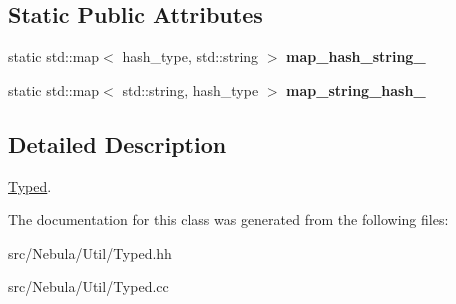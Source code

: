\subsection*{\-Static \-Public \-Attributes}
\begin{DoxyCompactItemize}
\item 
\hypertarget{classNeb_1_1Util_1_1Typed_ac2b126b7bc6253459783fa73b9a68afe}{static std\-::map$<$ hash\-\_\-type, \*
std\-::string $>$ {\bfseries map\-\_\-hash\-\_\-string\-\_\-}}\label{classNeb_1_1Util_1_1Typed_ac2b126b7bc6253459783fa73b9a68afe}

\item 
\hypertarget{classNeb_1_1Util_1_1Typed_af1437465dca6b5a70b2e900e6391e62a}{static std\-::map$<$ std\-::string, \*
hash\-\_\-type $>$ {\bfseries map\-\_\-string\-\_\-hash\-\_\-}}\label{classNeb_1_1Util_1_1Typed_af1437465dca6b5a70b2e900e6391e62a}

\end{DoxyCompactItemize}


\subsection{\-Detailed \-Description}
\hyperlink{classNeb_1_1Util_1_1Typed}{\-Typed}. 

\-The documentation for this class was generated from the following files\-:\begin{DoxyCompactItemize}
\item 
src/\-Nebula/\-Util/\-Typed.\-hh\item 
src/\-Nebula/\-Util/\-Typed.\-cc\end{DoxyCompactItemize}
